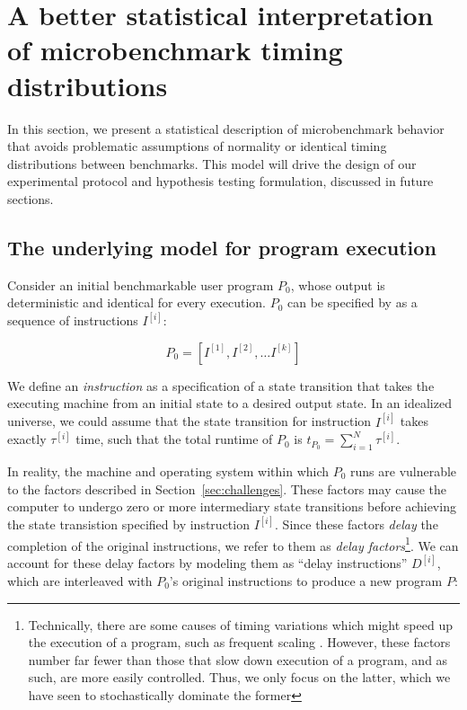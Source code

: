\documentclass[conference]{IEEEtran}
\begin{document}
\label{sec:model}
\section{A better statistical interpretation of microbenchmark timing distributions}

In this section, we present a statistical description of microbenchmark behavior that avoids
problematic assumptions of normality or identical timing distributions between benchmarks.
This model will drive the design of our experimental protocol and hypothesis testing
formulation, discussed in future sections.

\subsection{The underlying model for program execution}

Consider an initial benchmarkable user program $P_0$, whose output is deterministic and
identical for every execution. $P_0$ can be specified by as a sequence of instructions
$I^{[i]}$:

\begin{equation}
    P_0 = \left[I^{[1]}, I^{[2]}, \dots I^{[k]}\right]
\end{equation}

We define an \textit{instruction} as a specification of a state transition that takes the
executing machine from an initial state to a desired output state. In an idealized universe,
we could assume that the state transition for instruction $I^{[i]}$ takes exactly
$\tau^{[i]}$ time, such that the total runtime of $P_0$ is $t_{P_0} = \sum_{i=1}^N
\tau^{[i]}$.

In reality, the machine and operating system within which $P_0$ runs are vulnerable to the
factors described in Section~\ref{sec:challenges}. These factors may cause the computer to
undergo zero or more intermediary state transitions before achieving the state transistion
specified by instruction $I^{[i]}$. Since these factors \textit{delay} the completion of the
original instructions, we refer to them as \textit{delay factors}\footnote{Technically,
there are some causes of timing variations which might speed up the execution of a program,
such as frequent scaling . However, these factors number far fewer than those
that slow down execution of a program, and as such, are more easily controlled. Thus, we
only focus on the latter, which we have seen to stochastically dominate the former
}. We can account for these delay factors by
modeling them as ``delay instructions'' $D^{[i]}$, which are interleaved with $P_0$'s
original instructions to produce a new program $P$:
\end{document}
